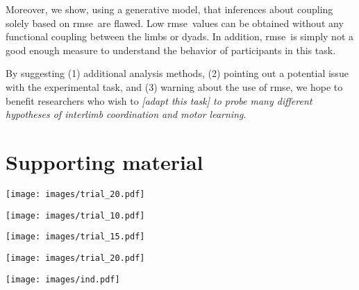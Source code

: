 \documentclass[11pt]{article}
\newcommand{\rmse}{\gls{rmse}}
\newcommand{\myquote}[1]{\textit{#1}}
\newcommand{\fg}[1]{\citet{Annand2020}, fig. #1}
\begin{document}
Moreover, we show, using a generative model, that inferences about coupling solely based on \rmse\ are flawed. Low \rmse\ values can be obtained without any functional coupling between the limbs or dyads. In addition,  \rmse\ is simply not a good enough measure to understand the behavior of participants in this task.

By suggesting (1) additional analysis methods, (2) pointing out a potential issue with the experimental task, and (3) warning about the use of \rmse, we hope to benefit researchers who wish to \myquote{[adapt this task] to probe many different hypotheses of interlimb coordination and motor learning}.




\setcounter{figure}{0} 
\appendix
\renewcommand\thefigure{S\arabic{figure}}
    
\section*{Supporting material}


\begin{figure*}[htb]
	\centering
	\texttt{[image: images/trial\_20.pdf]}
	\caption{Analysis of trial 5 (Data from \fg{5}). Similar as figure \ref{fig:trial1}}
	\label{fig:trial5}
\end{figure*}


\begin{figure*}[htb]
	\centering
	\texttt{[image: images/trial\_10.pdf]}
	\caption{Analysis of trial 10 (Data from \fg{5}). Similar as figure \ref{fig:trial1}}
	\label{fig:trial10}
\end{figure*}



\begin{figure*}[htb]
	\centering
	\texttt{[image: images/trial\_15.pdf]}
	\caption{Analysis of trial 15 (Data from \fg{5}). Similar as figure \ref{fig:trial1}}
	\label{fig:trial15}
\end{figure*}

\begin{figure*}[htb]
	\centering
	\texttt{[image: images/trial\_20.pdf]}
	\caption{Analysis Trial 20 (Data from \fg{5}). Similar as figure \ref{fig:trial1}}
	\label{fig:trial20}
\end{figure*}

\begin{figure*}[htb]
	\centering
	\texttt{[image: images/ind.pdf]}
	\caption{Analysis of the data of the individual that \myquote{failed to produce stable coordination with the target by the end of the experiment} (\fg{7}). Similar as figure \ref{fig:trial1}}
	\label{fig:ind}
\end{figure*}
\end{document}
